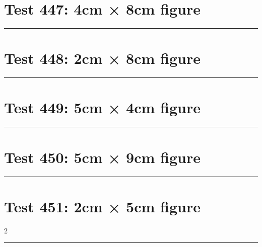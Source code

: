 \documentclass[a4paper,11pt]{article}
\begin{document}
\section*{Test 447: 4cm × 8cm figure}
\begin{swarmwrap}%
  \begin{minipage}[t]{4cm}
    \centering
    \rule{\linewidth}{8cm}
  \end{minipage}%
\end{swarmwrap}%
\swarmwrapnext
\lipsum[16]
\lipsum[17]
\lipsum[18]
\lipsum[19]
\lipsum[20]
\section*{Test 448: 2cm × 8cm figure}
\begin{swarmwrap}%
  \begin{minipage}[t]{2cm}
    \centering
    \rule{\linewidth}{8cm}
  \end{minipage}%
\end{swarmwrap}%
\swarmwrapnext
\lipsum[133]
\lipsum[134]
\lipsum[135]
\lipsum[136]
\lipsum[137]
\section*{Test 449: 5cm × 4cm figure}
\begin{swarmwrap}%
  \begin{minipage}[t]{5cm}
    \centering
    \rule{\linewidth}{4cm}
  \end{minipage}%
\end{swarmwrap}%
\swarmwrapnext
\lipsum[38]
\lipsum[39]
\lipsum[40]
\section*{Test 450: 5cm × 9cm figure}
\begin{swarmwrap}%
  \begin{minipage}[t]{5cm}
    \centering
    \rule{\linewidth}{9cm}
  \end{minipage}%
\end{swarmwrap}%
\swarmwrapnext
\lipsum[34]
\lipsum[35]
\lipsum[36]
\section*{Test 451: 2cm × 5cm figure}
\begin{multicols}{2}
  \begin{swarmwrap}%
    \begin{minipage}[t]{2cm}
      \centering
      \rule{\linewidth}{5cm}
    \end{minipage}%
  \end{swarmwrap}%
  \swarmwrapnext
  \lipsum[94]
  \lipsum[95]
  \lipsum[96]
  \lipsum[97]
  \lipsum[98]
\end{multicols}
\end{document}
